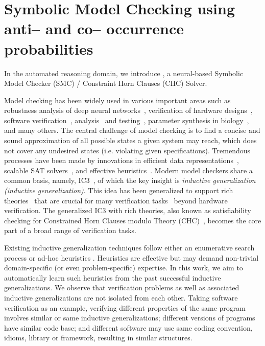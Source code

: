 \section{Symbolic Model Checking using anti-- and co-- occurrence probabilities}
In the automated reasoning domain, we introduce \dpy, a neural-based Symbolic Model Checker (SMC) / Constraint Horn Clauses (CHC) Solver.

Model checking has been widely used in various important areas such as robustness analysis of deep neural networks~\cite{Katz:cav19}, verification of hardware designs~\cite{SMC96}, software verification~\cite{Ball02}, analysis~\cite{ESC-java-02} and testing~\cite{Sheyner:SP02}, parameter synthesis in biology~\cite{Barnat:biology12}, and many others. 
The central challenge of model checking is to find a concise and sound approximation of all possible states a given system may reach, which does not cover any undesired states (i.e. violating given specifications). 
Tremendous processes have been made by innovations in efficient data representations~\cite{BDD}, scalable SAT solvers~\cite{CDCL,chaff,minisat}, and effective heuristics~\cite{CEGAR,BMC,McMillan:cav06}.  
Modern model checkers share a common basis, namely, IC3~\cite{IC3}, of which the key insight is \textit{inductive generalization (inductive generalization)}.
This idea has been generalized to support rich theories~\cite{GPDR} that are crucial for many verification tasks~\cite{Komuravelli:cav13,SeaHorn} beyond hardware verification. 
The generalized IC3 with rich theories, also known as satisfiability checking for Constrained Horn Clauses modulo Theory
(CHC)~\cite{DBLP:conf/birthday/BjornerGMR15}, becomes the core part of a broad range of verification tasks.



Existing inductive generalization techniques follow either an enumerative search process \cite{IC3,Bradley:fmcad11} or ad-hoc heuristics \cite{Griggio:CAD16,GSpacer}. 
Heuristics are effective but may demand non-trivial domain-specific (or even problem-specific) expertise. 
In this work, we aim to automatically learn such heuristics from the past successful inductive generalizations. 
We observe that verification problems as well as associated inductive generalizations are not isolated from each other. 
Taking software verification as an example, verifying different properties of the same program involves similar or same inductive generalizations; different versions of programs have similar code base; and
different software may use same coding convention, idioms, library or framework, resulting in similar structures.


